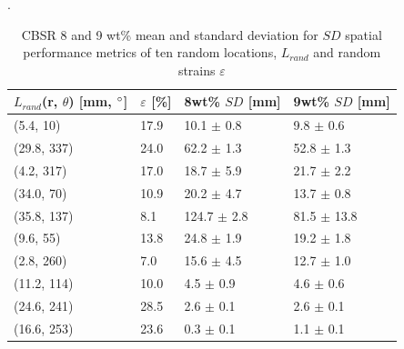 \begin{table}[H]
	\caption{CBSR 8 and 9 wt\% mean and standard deviation for $S\!D$ spatial performance metrics of ten random locations, $L_{rand}$ and random strains $\varepsilon$}. %
	\label{tab:spatial_sd_metrics_stats_8p_rand_loads}
	\centering
	\hspace{0.4cm}
	\begin{tabular}{p{2.5cm}p{0.8cm}p{1.8cm}p{1.8cm}}
		\hline       
		$L_{rand}$(r, $\theta$) [mm, $\degree$] & $\varepsilon$ [\%] & 8wt\% $S\!D$ [mm] & 9wt\% $S\!D$ [mm] \\ \hline
		(5.4, 10) & 17.9 & 10.1 $\pm$ 0.8 & 9.8 $\pm$ 0.6\\
		(29.8, 337) & 24.0 & 62.2 $\pm$ 1.3 & 52.8 $\pm$ 1.3\\
		(4.2, 317) & 17.0 & 18.7 $\pm$ 5.9 & 21.7 $\pm$ 2.2\\
		(34.0, 70) & 10.9 & 20.2 $\pm$ 4.7 & 13.7 $\pm$ 0.8\\
		(35.8, 137) & 8.1 & 124.7 $\pm$ 2.8 & 81.5 $\pm$ 13.8\\
		(9.6, 55) & 13.8 & 24.8 $\pm$ 1.9 & 19.2 $\pm$ 1.8\\
		(2.8, 260) & 7.0 & 15.6 $\pm$ 4.5 & 12.7 $\pm$ 1.0\\
		(11.2, 114) & 10.0 & 4.5 $\pm$ 0.9 & 4.6 $\pm$ 0.6\\
		(24.6, 241) & 28.5 & 2.6 $\pm$ 0.1 & 2.6 $\pm$ 0.1\\
		(16.6, 253) & 23.6 & 0.3 $\pm$ 0.1 & 1.1 $\pm$ 0.1\\
		\hline
	\end{tabular}
\end{table}
